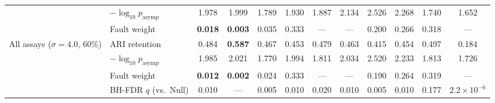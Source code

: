 \begin{table}[t]
\begin{tabular}{llcccccccccc}
 & $-\log_{10}p_{\mathrm{asymp}}$ & 1.978 & 1.999 & 1.789 & 1.930 & 1.887 & 2.134 & 2.526 & 2.268 & 1.740 & 1.652 \\
 & Fault weight & \textbf{0.018} & \textbf{0.003} & 0.035 & 0.333 & --- & --- & 0.200 & 0.266 & 0.318 & --- \\
\midrule
All assays ($\sigma{=}4.0$, 60\%) & ARI retention & 0.484 & \textbf{0.587} & 0.467 & 0.453 & 0.479 & 0.463 & 0.415 & 0.454 & 0.497 & 0.184 \\
 & $-\log_{10}p_{\mathrm{asymp}}$ & 1.985 & 2.021 & 1.770 & 1.994 & 1.811 & 2.034 & 2.520 & 2.233 & 1.813 & 1.726 \\
 & Fault weight & \textbf{0.012} & \textbf{0.002} & 0.024 & 0.333 & --- & --- & 0.190 & 0.264 & 0.319 & --- \\
 & BH-FDR $q$ (vs.\ Null) & 0.010 & --- & 0.005 & 0.010 & 0.020 & 0.010 & 0.005 & 0.010 & 0.177 & $2.2{\times}10^{-6}$ \\
\bottomrule
\end{tabular}
\end{table}
